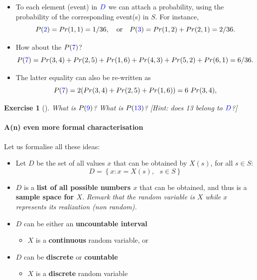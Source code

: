 \documentclass[smaller, handout]{beamer}\usepackage[]{graphicx}\usepackage[]{color}
\newtheorem{exercise}{Exercise}[section]
\begin{document}
\begin{frame}{\secname}
  \begin{example}[continued]
  \begin{itemize}
  \item To each element (event) in $\color{blue}D\color{black}$ we can attach a probability, using the probability of the corresponding event(s) in $S$. For instance,
  $$
  P(\color{blue}2\color{black})=Pr(1,1)=1/36, \quad \text{or} \quad P(\color{blue}3\color{black})=Pr(1,2)+Pr(2,1)=2/36.
  $$
  \vspace{-0.3cm}
  \item How about the $P(\color{blue}7\color{black})$?
  \begin{equation*}
  P(\color{blue}7\color{black})=Pr(3,4)+Pr(2,5)+Pr(1,6)+Pr(4,3)+Pr(5,2)+Pr(6,1)=6/36.
  \end{equation*}
  \vspace{-0.3cm}
  \item The latter equality can also be re-written as
  \[P(\color{blue}7\color{black})=2(Pr(3,4)+Pr(2,5)+Pr(1,6))=6 \ Pr(3,4),\]
  \vspace{-0.3cm}
  \end{itemize}
  \end{example}
  \begin{exercise}[]
  What is $P(\color{blue} 9 \color{black})$? What is $P(\color{blue} 13 \color{black})$? [Hint: does \color{blue} 13 \color{black} belong to $\color{blue} D \color{black}$?]
  \end{exercise}
\end{frame}

\begin{frame}{\secname}
\framesubtitle{A(n) even more formal characterisation}

  Let us formalise all these ideas:

  \begin{itemize}
  \item Let $D$ be the set of all values $x$ that can be obtained by $X\left(
  s\right) $, for all $s\in S$:%
  \begin{equation*}
  D=\left\{ x:x=X\left( s\right) ,\text{ }s\in S\right\}
  \end{equation*}
  \item $D$ is a \textbf{list of all possible numbers $x$} that can be obtained, and
  thus is a \textbf{sample space for $X$}. \textit{Remark that the random variable is $X$
  while $x$ represents its realization (non random).}
  \item $D$ can be either an \textbf{uncountable interval}
  \begin{itemize}
  \item $X$ is a \textbf{continuous} random variable, or
  \end{itemize}
  \item $D$ can be \textbf{discrete} or \textbf{countable}
  \begin{itemize}
  \item $X$ is a \textbf{discrete} random variable
  \end{itemize}
  \end{itemize}
\end{frame}
\end{document}
